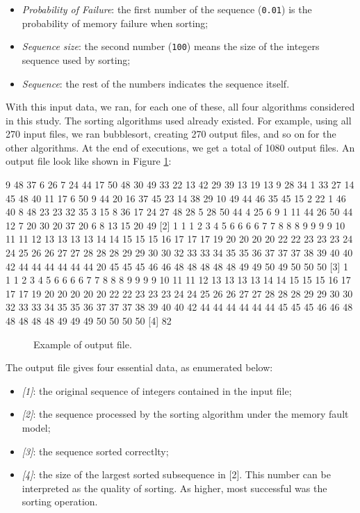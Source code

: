 \begin{itemize}
    \item \textit{Probability of Failure}: the first number of the sequence (\texttt{0.01}) is the probability of memory failure when sorting;
    \item \textit{Sequence size}: the second number (\texttt{100}) means the size of the integers sequence used by sorting;
    \item \textit{Sequence}: the rest of the numbers indicates the sequence itself.
\end{itemize}

With this input data, we ran, for each one of these, all four algorithms considered in this study. The sorting algorithms used already existed. For example, using all 270 input files, we ran bubblesort, creating 270 output files, and so on for the other algorithms. At the end of executions, we get a total of 1080 output files. An output file look like shown in Figure \ref{fig-output-file-example}:

\begin{verbbox}[\mbox{}]
[1]  9 48 37 6 26 7 24 44 17 50 48 30 49 33 22 13 42 29 39 13 19 13 9 28 34 1
33 27 14 45 48 40 11 17 6 50 9 44 20 16 37 45 23 14 38 29 10 49 44 46 35 45  
15 2 22 1 46 40 8 48 23 23 32 35 3 15 8 36 17 24 27 48 28 5 28 50 44 4 25 6 9
1 11 44 26 50 44 12 7 20 30 20 37 20 6 8 13 15 20 49
[2]  1 1 1 2 3 4 5 6 6 6 6 7 7 8 8 8 9 9 9 9 10 11 11 12 13 13 13 13 14 14 15 
15 15 16 17 17 17 19 20 20 20 20 22 22 23 23 23 24 24 25 26 26 27 27 28 28 28 
29 29 30 30 32 33 33 34 35 35 36 37 37 37 38 39 40 40 42 44 44 44 44 44 44 20 
45 45 45 46 46 48 48 48 48 48 49 49 50 49 50 50 50
[3]  1 1 1 2 3 4 5 6 6 6 6 7 7 8 8 8 9 9 9 9 10 11 11 12 13 13 13 13 14 14 15 
15 15 16 17 17 17 19 20 20 20 20 20 22 22 23 23 23 24 24 25 26 26 27 27 28 28 
28 29 29 30 30 32 33 33 34 35 35 36 37 37 37 38 39 40 40 42 44 44 44 44 44 44 
45 45 45 46 46 48 48 48 48 48 49 49 49 50 50 50 50
[4]  82
\end{verbbox}
    
\begin{figure}[H]
    \centering
    \fbox{
    \theverbbox
    }
    \caption{Example of output file.}
    \label{fig-output-file-example}
\end{figure}

The output file gives four essential data, as enumerated below:
\begin{itemize}
    \item \textit{[1]}: the original sequence of integers contained in the input file;
    \item \textit{[2]}: the sequence processed by the sorting algorithm under the memory fault model;
    \item \textit{[3]}: the sequence sorted correctlty;
    \item \textit{[4]}: the size of the largest sorted subsequence in [2]. This number can be interpreted as the quality of sorting. As higher, most successful was the sorting operation.
\end{itemize}

